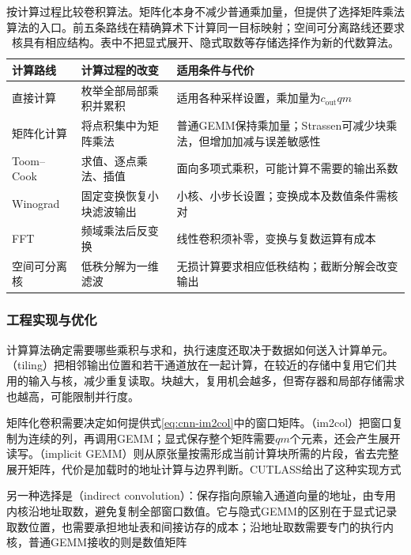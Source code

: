 \begin{table}[htb]
  \centering
  \begin{tabularx}{\linewidth}{@{}lXX@{}}
    \toprule
    计算路线 & 计算过程的改变 & 适用条件与代价\\
    \midrule
    直接计算 & 枚举全部局部乘积并累积 & 适用各种采样设置，乘加量为$c_{\mathrm{out}}qm$\\
    矩阵化计算 & 将点积集中为矩阵乘法 & 普通GEMM保持乘加量；Strassen可减少块乘法，但增加加减与误差敏感性\\
    Toom--Cook & 求值、逐点乘法、插值 & 面向多项式乘积，可能计算不需要的输出系数\\
    Winograd & 固定变换恢复小块滤波输出 & 小核、小步长设置；变换成本及数值条件需核对\\
    FFT & 频域乘法后反变换 & 线性卷积须补零，变换与复数运算有成本\\
    空间可分离核 & 低秩分解为一维滤波 & 无损计算要求相应低秩结构；截断分解会改变输出\\
    \bottomrule
  \end{tabularx}
  \caption{按计算过程比较卷积算法。矩阵化本身不减少普通乘加量，但提供了选择矩阵乘法算法的入口。前五条路线在精确算术下计算同一目标映射；空间可分离路线还要求核具有相应结构。表中不把显式展开、隐式取数等存储选择作为新的代数算法。}
  \label{tab:cnn-algorithms}
\end{table}

\subsubsection{工程实现与优化}
\label{sec:cnn-engineering}

计算算法确定需要哪些乘积与求和，执行速度还取决于数据如何送入计算单元。（tiling）把相邻输出位置和若干通道放在一起计算，在较近的存储中复用它们共用的输入与核，减少重复读取。块越大，复用机会越多，但寄存器和局部存储需求也越高，可能限制并行度。

矩阵化卷积需要决定如何提供式\eqref{eq:cnn-im2col}中的窗口矩阵。（im2col）把窗口复制为连续的列，再调用GEMM；显式保存整个矩阵需要$qm$个元素，还会产生展开读写。（implicit GEMM）则从原张量按需形成当前计算块所需的片段，省去完整展开矩阵，代价是加载时的地址计算与边界判断。CUTLASS给出了这种实现方式

另一种选择是（indirect convolution）：保存指向原输入通道向量的地址，由专用内核沿地址取数，避免复制全部窗口数值。它与隐式GEMM的区别在于显式记录取数位置，也需要承担地址表和间接访存的成本；沿地址取数需要专门的执行内核，普通GEMM接收的则是数值矩阵

